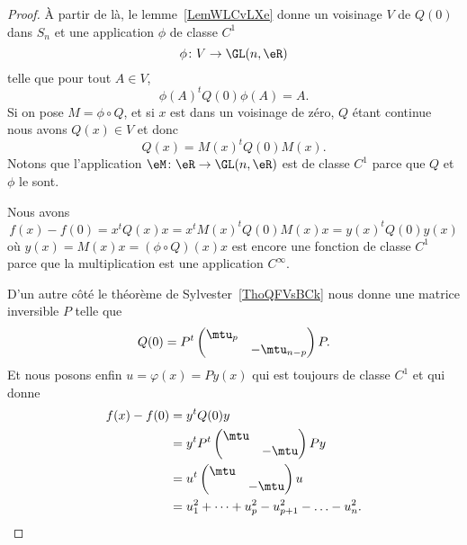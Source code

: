 \begin{proof}
	À partir de là, le lemme~\ref{LemWLCvLXe} donne un voisinage \( V\) de \( Q(0)\) dans \( S_n\) et une application \( \phi\) de classe \( C^1\)
	\begin{equation}
		\phi\colon V\to \GL(n,\eR) \\
	\end{equation}
	telle que pour tout \( A\in V\),
	\begin{equation}
		\phi(A)^tQ(0)\phi(A)=A.
	\end{equation}
	Si on pose \( M=\phi\circ Q\), et si \( x\) est dans un voisinage de zéro, \( Q\) étant continue nous avons \( Q(x)\in V\) et donc
	\begin{equation}
		Q(x)=M(x)^tQ(0)M(x).
	\end{equation}
	Notons que l'application \( \eM\colon \eR\to \GL(n,\eR)\) est de classe \( C^1\) parce que \( Q\) et \( \phi\) le sont.

	Nous avons
	\begin{equation}
		f(x)-f(0)=x^tQ(x)x=x^tM(x)^tQ(0)M(x)x=y(x)^tQ(0)y(x)
	\end{equation}
	où \( y(x)=M(x)x=(\phi\circ Q)(x)x\) est encore une fonction de classe \( C^1\) parce que la multiplication est une application \(  C^{\infty}\).

	D'un autre côté le théorème de Sylvester~\ref{ThoQFVsBCk} nous donne une matrice inversible \( P\) telle que
	\begin{equation}
		Q(0)=P^t\begin{pmatrix}
			\mtu_p &             \\
			       & -\mtu_{n-p}
		\end{pmatrix}P.
	\end{equation}
	Et nous posons enfin \( u=\varphi(x)=Py(x)\) qui est toujours de classe \( C^1\) et qui donne
	\begin{subequations}
		\begin{align}
			f(x)-f(0) & =y^tQ(0)y                                     \\
			          & =y^tP^t\begin{pmatrix}
				\mtu &       \\
				     & -\mtu
			\end{pmatrix}Py          \\
			          & =u^t\begin{pmatrix}
				\mtu &       \\
				     & -\mtu
			\end{pmatrix}u              \\
			          & =u_1^2+\cdots +u_p^2-u_{p+1}^2-\ldots -u_n^2.
		\end{align}
	\end{subequations}


\end{proof}
